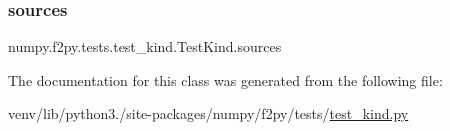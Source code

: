 \subsubsection{\texorpdfstring{sources}{sources}}
{\footnotesize\ttfamily numpy.\+f2py.\+tests.\+test\+\_\+kind.\+Test\+Kind.\+sources\hspace{0.3cm}{\ttfamily [static]}}



The documentation for this class was generated from the following file\+:\begin{DoxyCompactItemize}
\item 
venv/lib/python3./site-\/packages/numpy/f2py/tests/\hyperlink{test__kind_8py}{test\+\_\+kind.\+py}\end{DoxyCompactItemize}

